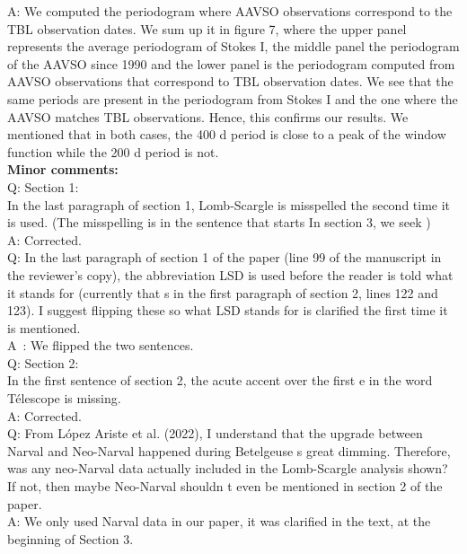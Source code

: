 \documentclass{article}
\begin{document}
A: We computed the periodogram where AAVSO observations correspond to the TBL observation dates. We sum up it in figure 7, where the upper panel represents the average periodogram of Stokes I, the middle panel the periodogram of the AAVSO since 1990 and the lower panel is the periodogram computed from AAVSO observations that correspond to TBL observation dates. We see that the same periods are present in the periodogram from Stokes I and the one where the AAVSO matches TBL observations. Hence, this confirms our results. We mentioned that in both cases, the 400 d period is close to a peak of the window function while the 200 d period is not. \\


\textbf{Minor comments:}\\

Q: Section 1:\\
In the last paragraph of section 1, Lomb-Scargle is misspelled the second time it is used. (The
misspelling is in the sentence that starts In section 3, we seek )\\

A: Corrected.\\

Q: In the last paragraph of section 1 of the paper (line 99 of the manuscript in the reviewer’s copy), the abbreviation LSD is used before the reader is told what it stands for (currently that s in the first paragraph of section 2, lines 122 and 123). I suggest flipping these so what LSD stands for
is clarified the first time it is mentioned.\\

A : We flipped the two sentences.\\

Q: Section 2:\\
In the first sentence of section 2, the acute accent over the first e in the word Télescope is missing.\\

A: Corrected.\\

Q: From López Ariste et al. (2022), I understand that the upgrade between Narval and Neo-Narval
happened during Betelgeuse s great dimming. Therefore, was any neo-Narval data actually
included in the Lomb-Scargle analysis shown? If not, then maybe Neo-Narval shouldn t even be
mentioned in section 2 of the paper.\\

A: We only used Narval data in our paper, it was clarified in the text, at the beginning of Section 3. \\
\end{document}

